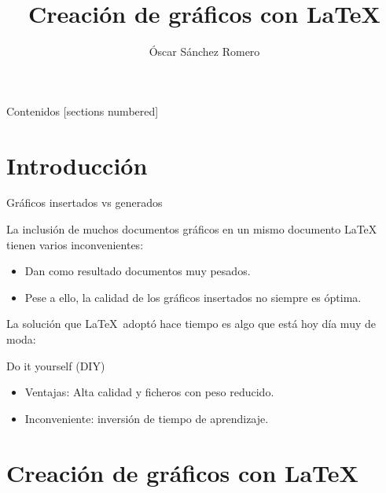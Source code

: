 \documentclass[10pt]{beamer}
\title{Creación de gráficos con \LaTeX{}}
\date{}
\author{Óscar Sánchez Romero}
\institute{Dpto. Matemática Aplicada, UGR}
\begin{document}
\maketitle

\begin{frame}{Contenidos}
  [sections numbered]
  \tableofcontents[hideallsubsections]
\end{frame}

\section{Introducción}


\begin{frame}{Gr\'aficos insertados vs generados}

La inclusi\'on de muchos documentos gr\'aficos en un mismo documento \LaTeX $ $ tienen varios inconvenientes:
\begin{itemize}
\item Dan como resultado documentos muy pesados.
\item Pese a ello, la calidad de los gr\'aficos insertados no siempre es 
 \'optima.
 \end{itemize}

La soluci\'on que \LaTeX \ adopt\'o   hace tiempo es algo que est\'a hoy d\'ia muy de moda:
\begin{center}
Do it yourself (DIY)
\end{center}
\begin{itemize}
\item {\small \color{red} Ventajas: }Alta calidad y ficheros con peso reducido.\\
\item {\small \color{red} Inconveniente:} inversión de tiempo de aprendizaje.
\end{itemize}
\end{frame}


\section{Creación de gráficos con LaTeX}
\end{document}
